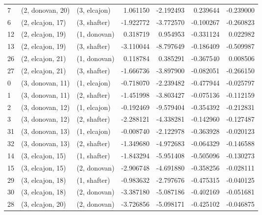 \begin{tabular}{lllrrrr}
7  &  (2, donovan, 20) &     (3, elcajon) &  1.061150 &  -2.192493 &   0.239644 & -0.239000 \\
6  &  (2, elcajon, 17) &     (3, shafter) & -1.922772 &  -3.772570 &  -0.100267 & -0.260823 \\
12 &  (2, elcajon, 19) &     (1, donovan) &  0.318719 &   0.954953 &  -0.331124 &  0.022982 \\
13 &  (2, elcajon, 19) &     (3, shafter) & -3.110044 &  -8.797649 &  -0.186409 & -0.509987 \\
26 &  (2, elcajon, 21) &     (1, donovan) &  0.118784 &   0.385291 &  -0.367540 &  0.008506 \\
27 &  (2, elcajon, 21) &     (3, shafter) & -1.666736 &  -3.897900 &  -0.082051 & -0.266150 \\
0  &  (3, donovan, 11) &     (1, elcajon) & -0.718070 &  -2.239482 &  -0.477944 & -0.025797 \\
1  &  (3, donovan, 11) &     (2, shafter) & -1.451998 &  -3.803427 &  -0.075136 & -0.112159 \\
2  &  (3, donovan, 12) &     (1, elcajon) & -0.192469 &  -9.579404 &  -0.354392 & -0.212831 \\
3  &  (3, donovan, 12) &     (2, shafter) & -2.288121 &  -4.338281 &  -0.142960 & -0.127487 \\
31 &  (3, donovan, 13) &     (1, elcajon) & -0.008740 &  -2.122978 &  -0.363928 & -0.020123 \\
32 &  (3, donovan, 13) &     (2, shafter) & -1.349680 &  -4.972683 &  -0.064329 & -0.146588 \\
14 &  (3, elcajon, 15) &     (1, shafter) & -1.843294 &  -5.951408 &  -0.505096 & -0.130273 \\
15 &  (3, elcajon, 15) &     (2, donovan) & -2.906748 &  -4.691880 &  -0.358256 & -0.028111 \\
29 &  (3, elcajon, 18) &     (1, shafter) & -0.983632 &  -2.797676 &  -0.475315 & -0.040125 \\
30 &  (3, elcajon, 18) &     (2, donovan) & -3.387180 &  -5.087186 &  -0.402169 & -0.051681 \\
28 &  (3, elcajon, 20) &     (2, donovan) & -3.726856 &  -5.098171 &  -0.425102 & -0.046875 \\
\bottomrule
\end{tabular}
